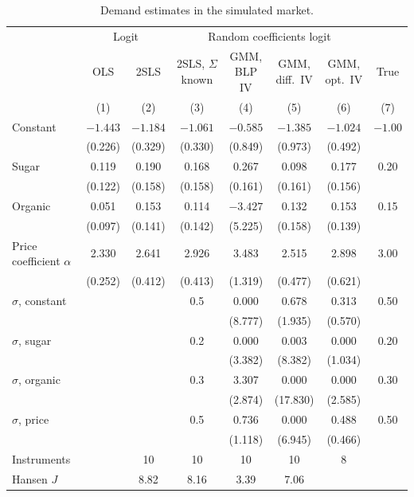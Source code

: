 \begin{table}[htbp]
\centering
\caption{Demand estimates in the simulated market.}
\label{tab:08-sim-demand}
\footnotesize
\setlength{\tabcolsep}{4pt}
\begin{tabular}{lccccccc}
\toprule
 & \multicolumn{2}{c}{Logit} & \multicolumn{4}{c}{Random coefficients logit} & \\
\cmidrule(lr){2-3}\cmidrule(lr){4-7}
 & OLS & 2SLS & \makecell{2SLS,\\ $\Sigma$ known} & \makecell{GMM,\\ BLP IV} & \makecell{GMM,\\ diff.\ IV}
 & \makecell{GMM,\\ opt.\ IV} & True \\
 & (1) & (2) & (3) & (4) & (5) & (6) & (7) \\
\midrule
Constant & $-1.443$ & $-1.184$ & $-1.061$ & $-0.585$ & $-1.385$ & $-1.024$ & $-1.00$ \\
 & (0.226) & (0.329) & (0.330) & (0.849) & (0.973) & (0.492) & \\
Sugar & 0.119 & 0.190 & 0.168 & 0.267 & 0.098 & 0.177 & 0.20 \\
 & (0.122) & (0.158) & (0.158) & (0.161) & (0.161) & (0.156) & \\
Organic & 0.051 & 0.153 & 0.114 & $-3.427$ & 0.132 & 0.153 & 0.15 \\
 & (0.097) & (0.141) & (0.142) & (5.225) & (0.158) & (0.139) & \\
Price coefficient $\alpha$ & 2.330 & 2.641 & 2.926 & 3.483 & 2.515 & 2.898 & 3.00 \\
 & (0.252) & (0.412) & (0.413) & (1.319) & (0.477) & (0.621) & \\
\addlinespace
$\sigma$, constant & & & 0.5 & 0.000 & 0.678 & 0.313 & 0.50 \\
 & & & & (8.777) & (1.935) & (0.570) & \\
$\sigma$, sugar & & & 0.2 & 0.000 & 0.003 & 0.000 & 0.20 \\
 & & & & (3.382) & (8.382) & (1.034) & \\
$\sigma$, organic & & & 0.3 & 3.307 & 0.000 & 0.000 & 0.30 \\
 & & & & (2.874) & (17.830) & (2.585) & \\
$\sigma$, price & & & 0.5 & 0.736 & 0.000 & 0.488 & 0.50 \\
 & & & & (1.118) & (6.945) & (0.466) & \\
\midrule
Instruments & & 10 & 10 & 10 & 10 & 8 & \\
Hansen $J$ & & 8.82 & 8.16 & 3.39 & 7.06 & & \\

\end{tabular}
\end{table}
